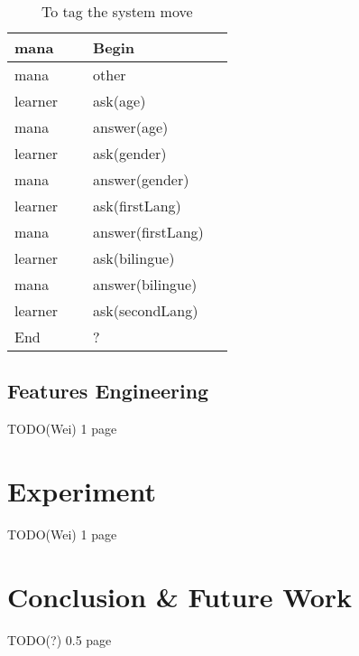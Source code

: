 \documentclass[a4paper]{article}
\begin{document}
\begin{table}
    \begin{tabular}{|l|l|}
        \hline
        mana    & Begin \\ \hline
        mana    & other              \\ \hline
        learner & ask(age)           \\ \hline
        mana    & answer(age)        \\ \hline
        learner & ask(gender)        \\ \hline
        mana    & answer(gender)     \\ \hline
        learner & ask(firstLang)     \\ \hline
        mana    & answer(firstLang)  \\ \hline
        learner & ask(bilingue)      \\ \hline
        mana    & answer(bilingue)   \\ \hline
        learner & ask(secondLang)    \\ \hline
        End     & ?                  \\ \hline
    \end{tabular}
    \caption{To tag the system move}
    \label{table:system_align}
\end{table}

\subsection{Features Engineering}
TODO(Wei)
1 page
\section{Experiment}
TODO(Wei)
1 page
\section{Conclusion \& Future Work}
TODO(?)
0.5 page
%
\end{document}
